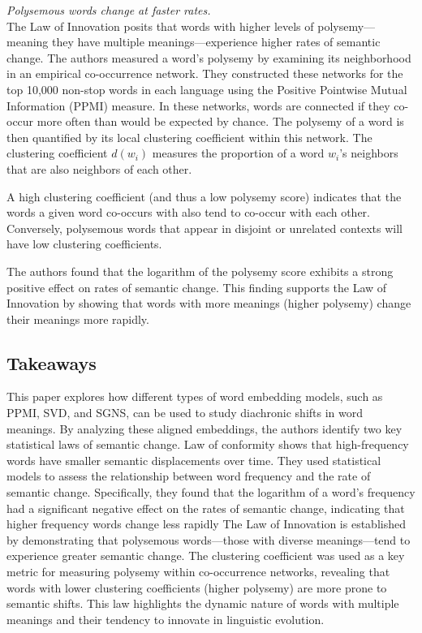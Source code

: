  \emph{Polysemous words change at faster rates.}\\
The Law of Innovation posits that words with higher levels of polysemy—meaning they have multiple meanings—experience higher rates of semantic change.
The authors measured a word’s polysemy by examining its neighborhood in an empirical co-occurrence network.
They constructed these networks for the top 10,000 non-stop words in each language using the Positive Pointwise Mutual Information (PPMI) measure.
In these networks, words are connected if they co-occur more often than would be expected by chance.
The polysemy of a word is then quantified by its local clustering coefficient within this network.
The clustering coefficient  $d(w_i)$  measures the proportion of a word  $w_i$’s neighbors that are also neighbors of each other.

A high clustering coefficient (and thus a low polysemy score) indicates that the words a given word co-occurs with also tend to co-occur with each other.
Conversely, polysemous words that appear in disjoint or unrelated contexts will have low clustering coefficients.

The authors found that the logarithm of the polysemy score exhibits a strong positive effect on rates of semantic change.
This finding supports the Law of Innovation by showing that words with more meanings (higher polysemy) change their meanings more rapidly.

\subsection{Takeaways}\label{subsec:takeaways4}
This paper explores how different types of word embedding models, such as PPMI, SVD, and SGNS, can be used to study diachronic shifts in word meanings.
By analyzing these aligned embeddings, the authors identify two key statistical laws of semantic change.
Law of conformity shows that high-frequency words have smaller semantic displacements over time.
They used statistical models to assess the relationship between word frequency and the rate of semantic change.
Specifically, they found that the logarithm of a word's frequency had a significant negative effect on the rates of semantic change, indicating that higher frequency words change less rapidly
The Law of Innovation is established by demonstrating that polysemous words—those with diverse meanings—tend to experience greater semantic change.
The clustering coefficient was used as a key metric for measuring polysemy within co-occurrence networks, revealing that words with lower clustering coefficients (higher polysemy) are more prone to semantic shifts.
This law highlights the dynamic nature of words with multiple meanings and their tendency to innovate in linguistic evolution.

